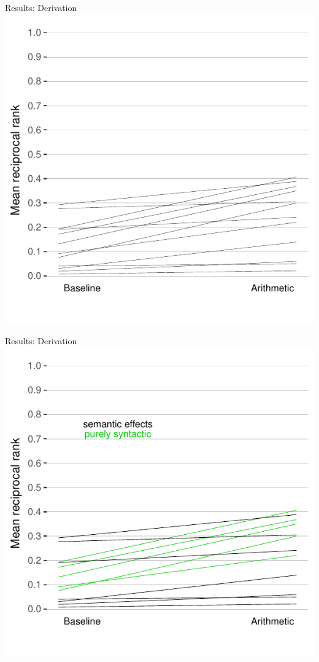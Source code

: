 \documentclass{beamer}
\begin{document}
\begin{frame}{Results: Derivation}
\centering
\includegraphics[scale=.8]{derivational.pdf}
\end{frame}
\begin{frame}{Results: Derivation}
\centering
\includegraphics[scale=.8]{derivational2.pdf}
\end{frame}
\end{document}
